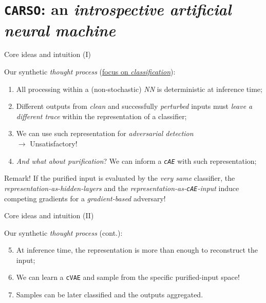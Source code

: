 
\section{ \texttt{CARSO}: an \textit{introspective artificial neural machine}}{

    \begin{frame}{ Core ideas and intuition (I)}

        Our synthetic \textit{thought process} (\underline{focus on \textit{classification}}):
        \begin{enumerate}
            \item All processing within a (non-stochastic) \textit{NN} is \alert{deterministic} at inference time;
            \item Different outputs from \textit{clean} and successfully \textit{perturbed} inputs must \textit{leave a \alert{different trace}} within the representation of a classifier;
            \item We can use such representation for \textit{adversarial detection}\\ $\rightarrow$ Unsatisfactory!
            \item \textit{And what about \alert{purification}}? We can inform a \textit{\alert{\texttt{cAE}}} with such representation;
        \end{enumerate}

    \begin{block}{Remark!}
    If the purified input is evaluated by the \textit{very same} classifier, the \textit{representation-as-hidden-layers} and the \textit{representation-as-\texttt{cAE}-input} induce \alert{competing} gradients for a \textit{gradient-based} adversary!
    \end{block}
    \end{frame}

    \begin{frame}{ Core ideas and intuition (II)}

    Our synthetic \textit{thought process} (cont.):
    \begin{enumerate}
        \setcounter{enumi}{4}
        \item At inference time, the \alert{representation is more than enough} to reconstruct the input;
        \item We can learn a \texttt{c\alert{V}AE} and sample from the specific purified-input space!
        \item Samples can be later classified and the outputs \alert{aggregated}.
    \end{enumerate}


\end{frame}}
